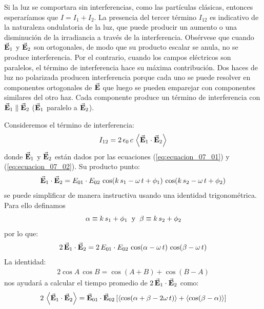 \documentclass[14pt]{extarticle}
\begin{document}
Si la luz se comportara sin interferencias, como las partículas clásicas, entonces esperaríamos que $I = I_{1} + I_{2}$. La presencia del tercer término $I_{12}$ es indicativo de la naturaleza ondulatoria de la luz, que puede producir un aumento o una disminución de la irradiancia a través de la interferencia. Obsérvese que cuando $\va{E}_{1}$ y $\va{E}_{2}$ son ortogonales, de modo que su producto escalar se anula, no se produce interferencia. Por el contrario, cuando los campos eléctricos son paralelos, el término de interferencia hace su máxima contribución. Dos haces de luz no polarizada producen interferencia porque cada uno se puede resolver en componentes ortogonales de $\va{E}$ que luego se pueden emparejar con componentes similares del otro haz. Cada componente produce un término de interferencia con $\va{E}_{1} \parallel \va{E}_{2}$ ($\va{E}_{1}$ paralelo a $\va{E}_{2}$).
\par
Consideremos el término de interferencia:
\begin{align}
I_{12} = 2 \, \epsilon_{0} \, c \, \expval{ \va{E}_{1} \cdot \va{E}_{2}}
\label{eq:ecuacion_07_06}
\end{align}
donde $\va{E}_{1}$ y $\va{E}_{2}$ están dados por las ecuaciones (\ref{eq:ecuacion_07_01}) y (\ref{eq:ecuacion_07_02}). Su producto punto:
\begin{align*}
\va{E}_{1} \cdot \va{E}_{2} = E_{01} \cdot E_{02} \, \cos (k \, s_{1} - \omega \, t + \phi_{1}) \, \cos (k \, s_{2} - \omega \, t + \phi_{2})
\end{align*}
se puede simplificar de manera instructiva usando una identidad trigonométrica. Para ello definamos
\begin{align*}
\alpha \equiv k \, s_{1} + \phi_{1} \hspace{0.2cm} \text{y} \hspace{0.2cm} \beta \equiv k \, s_{2} + \phi_{2}
\end{align*}
por lo que:
\begin{align*}
2 \, \va{E}_{1} \cdot \va{E}_{2} = 2 \, E_{01} \cdot E_{02} \, \cos(\alpha - \omega \, t) \, \cos(\beta - \omega \, t)
\end{align*}
La identidad:
\begin{align*}
2 \cos A \, \cos B = \cos (A + B) + \cos (B - A)
\end{align*}
nos ayudará a calcular el tiempo promedio de $2 \, \va{E}_{1} \cdot \va{E}_{2}$ como:
\begin{align*}
2 \, \expval{\va{E}_{1} \cdot \va{E}_{2}} = \va{E}_{01} \cdot \va{E}_{02} \left[ \expval{\cos (\alpha + \beta - 2 \omega \, t)} + \expval{\cos (\beta - \alpha)} \right]
\end{align*}
\end{document}
